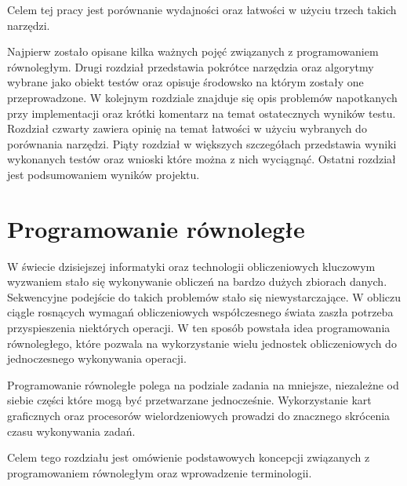 \documentclass[a4paper,12pt]{book} %
\begin{document}
Celem tej pracy jest porównanie wydajności oraz łatwości w użyciu trzech takich narzędzi. 

Najpierw zostało opisane kilka ważnych pojęć związanych z programowaniem równoległym. Drugi rozdział przedstawia pokrótce narzędzia oraz algorytmy wybrane jako obiekt testów oraz opisuje środowsko na którym zostały one przeprowadzone. W kolejnym rozdziale znajduje się opis problemów napotkanych przy implementacji oraz krótki komentarz na temat ostatecznych wyników testu. Rozdział czwarty zawiera opinię na temat łatwości w użyciu wybranych do porównania narzędzi. Piąty rozdział w większych szczegółach przedstawia wyniki wykonanych testów oraz wnioski które można z nich wyciągnąć. Ostatni rozdział jest podsumowaniem wyników projektu.

\chapter{Programowanie równoległe}
W świecie dzisiejszej informatyki oraz technologii obliczeniowych kluczowym wyzwaniem stało się wykonywanie obliczeń na bardzo dużych zbiorach danych. Sekwencyjne podejście do takich problemów stało się niewystarczające. W obliczu ciągle rosnących wymagań obliczeniowych współczesnego świata zaszła potrzeba przyspieszenia niektórych operacji. W ten sposób powstała idea programowania równoległego, które pozwala na wykorzystanie wielu jednostek obliczeniowych do jednoczesnego wykonywania operacji.

Programowanie równoległe polega na podziale zadania na mniejsze, niezależne od siebie części które mogą być przetwarzane jednocześnie. Wykorzystanie kart graficznych oraz procesorów wielordzeniowych prowadzi do znacznego skrócenia czasu wykonywania zadań.

Celem tego rozdziału jest omówienie podstawowych koncepcji związanych z programowaniem równoległym oraz wprowadzenie terminologii.
\end{document}
